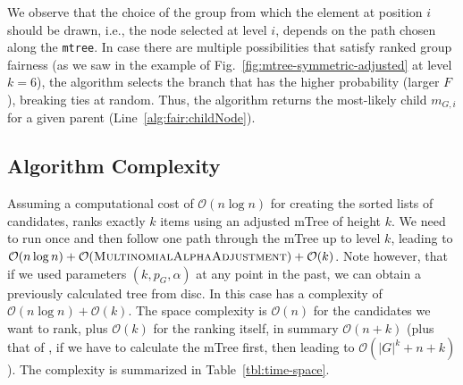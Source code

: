 We observe that the choice of the group from which the element at position $i$ should be drawn, i.e., the node selected at level $i$, depends on the path chosen along the \texttt{mtree}. %
%
In case there are multiple possibilities that satisfy ranked group fairness (as we saw in the example of Fig.~\ref{fig:mtree-symmetric-adjusted} at level $k=6$), the algorithm selects the branch that has the higher probability (larger $F$), breaking ties at random.
%
%
Thus, the algorithm returns the most-likely child $m_{G,i}$ for a given parent (Line~\ref{alg:fair:childNode}).
%


\subsection{Algorithm Complexity}\label{subsec:FAIR-complexity}
Assuming a computational cost of $\mathcal{O}(n \log{} n)$ for creating the sorted lists of candidates, \algoFAIR ranks exactly $k$ items using an adjusted mTree of height $k$.
%
We need to run \algoMultBinary once and then follow one path through the mTree up to level $k$, leading to $\mathcal{O}(n \log{} n) + \mathcal{O} (\text{{\sc MultinomialAlphaAdjustment}}) + \mathcal{O}(k)$.
%
Note however, that if we used parameters $(k, p_G, \alpha)$ at any point in the past, we can obtain a previously calculated tree from disc.
%
In this case \algoFAIR has a complexity of $\mathcal{O}(n \log{} n) + \mathcal{O}(k)$.
%
The space complexity is $\mathcal{O}(n)$ for the candidates we want to rank, plus $\mathcal{O}(k)$ for the ranking itself, in summary $\mathcal{O}(n + k)$ (plus that of \algoMultBinary, if we have to calculate the mTree first, then leading to $\mathcal{O}(|G|^k + n + k)$).
%
The complexity is summarized in Table~\ref{tbl:time-space}.
%

